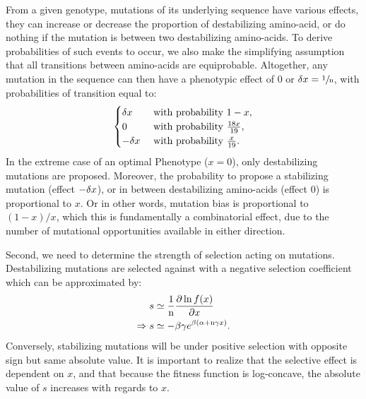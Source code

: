 From a given genotype, mutations of its underlying sequence have various effects, they can increase or decrease the proportion of destabilizing amino-acid, or do nothing if the mutation is between two destabilizing amino-acids.
To derive probabilities of such events to occur, we also make the simplifying assumption that all {transitions} between amino-acids are equiprobable.
Altogether, any mutation in the sequence can then have a phenotypic effect of $0$ or $\delta x=\sfrac{1}{\text{n}}$, with probabilities of {transition} equal to:
\begin{gather}
 \begin{cases}
 \dx &\text{ with probability } 1-x, \\
 0 &\text{ with probability } \frac{18 x }{19}, \\
 -\dx &\text{ with probability } \frac{x}{19}.\\
 \end{cases} \label{eq:proba}
\end{gather}
In the extreme case of an optimal \gls{Phenotype} ($x = 0$), only destabilizing mutations are proposed.
Moreover, the probability to propose a stabilizing mutation (effect $-\delta x$), or in between destabilizing amino-acids (effect $0$) is proportional to $x$. 
Or in other words, mutation bias is proportional to $(1-x)/x$, which this is fundamentally a combinatorial effect, due to the number of mutational opportunities available in either direction.

Second, we need to determine the strength of selection acting on mutations.
Destabilizing mutations are selected against with a negative selection coefficient which can be approximated by:
\begin{align}
 s & \simeq \frac{1}{\Nsite}\frac{ \partial \ln f(x) }{\partial x} \label{eq:s} \\
 \Rightarrow s & \simeq - \beta \gamma e^{\beta (\DeltaGmin + \Nsite \gamma x)}. \label{eq:s-unfolded}
\end{align}
Conversely, stabilizing mutations will be under positive selection with opposite sign but same absolute value.
It is important to realize that the selective effect is dependent on $x$, and that because the fitness function is log-concave, the absolute value of $s$ increases with regards to $x$.

